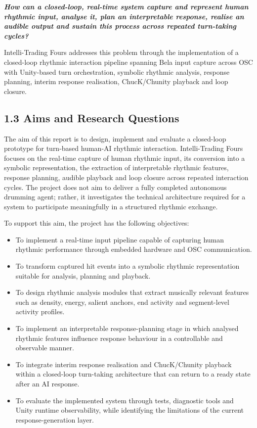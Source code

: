 \emph{\textbf{How can a closed-loop, real-time system capture and
represent human rhythmic input, analyse it, plan an interpretable
response, realise an audible output and sustain this process across
repeated turn-taking cycles?}}

Intelli-Trading Fours addresses this problem through the implementation
of a closed-loop rhythmic interaction pipeline spanning Bela input
capture across OSC with Unity-based turn orchestration, symbolic
rhythmic analysis, response planning, interim response realisation,
ChucK/Chunity playback and loop closure.

\subsection{1.3 Aims and Research
Questions}\label{aims-and-research-questions}

The aim of this report is to design, implement and evaluate a
closed-loop prototype for turn-based human-AI rhythmic interaction.
Intelli-Trading Fours focuses on the real-time capture of human rhythmic
input, its conversion into a symbolic representation, the extraction of
interpretable rhythmic features, response planning, audible playback and
loop closure across repeated interaction cycles. The project does not
aim to deliver a fully completed autonomous drumming agent; rather, it
investigates the technical architecture required for a system to
participate meaningfully in a structured rhythmic exchange.

To support this aim, the project has the following objectives:

\begin{itemize}
\item
  To implement a real-time input pipeline capable of capturing human
  rhythmic performance through embedded hardware and OSC communication.
\item
  To transform captured hit events into a symbolic rhythmic
  representation suitable for analysis, planning and playback.
\item
  To design rhythmic analysis modules that extract musically relevant
  features such as density, energy, salient anchors, end activity and
  segment-level activity profiles.
\item
  To implement an interpretable response-planning stage in which
  analysed rhythmic features influence response behaviour in a
  controllable and observable manner.
\item
  To integrate interim response realisation and ChucK/Chunity playback
  within a closed-loop turn-taking architecture that can return to a
  ready state after an AI response.
\item
  To evaluate the implemented system through tests, diagnostic tools and
  Unity runtime observability, while identifying the limitations of the
  current response-generation layer.
\end{itemize}

